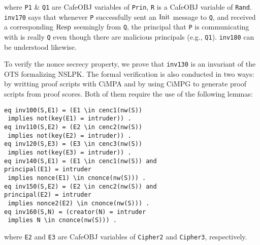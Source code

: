 \documentclass[10pt, conference, compsocconf]{IEEEtran}
\begin{document}
\noindent
where \verb!P1! \& \verb!Q1! are CafeOBJ variables of \verb!Prin!, \verb!R! is a CafeOBJ variable of \verb!Rand!.
\verb!inv170! says that whenever \verb!P! successfully sent an $\rm Init$ message to \verb!Q!, and
received a corresponding $\rm Resp$ seemingly from \verb!Q!,
the principal that \verb!P! is communicating with is really \verb!Q! even though there are malicious principals (e.g., \verb!Q1!).
\verb!inv180! can be understood likewise.

To verify the nonce secrecy property, we prove that \verb!inv130! is an invariant of the OTS formalizing NSLPK. 
The formal verification is also conducted in two ways: by writting proof scripts with CiMPA and by using CiMPG to generate proof scripts from proof scores.
Both of them require the use of the following lemmas:

\begin{small}
	\begin{verbatim}
eq inv100(S,E1) = (E1 \in cenc1(nw(S)) 
 implies not(key(E1) = intruder)) .
eq inv110(S,E2) = (E2 \in cenc2(nw(S)) 
 implies not(key(E2) = intruder)) .
eq inv120(S,E3) = (E3 \in cenc3(nw(S)) 
 implies not(key(E3) = intruder)) .
eq inv140(S,E1) = (E1 \in cenc1(nw(S)) and 
principal(E1) = intruder 
 implies nonce(E1) \in cnonce(nw(S))) .
eq inv150(S,E2) = (E2 \in cenc2(nw(S)) and 
principal(E2) = intruder
 implies nonce2(E2) \in cnonce(nw(S))) .
eq inv160(S,N) = (creator(N) = intruder 
 implies N \in cnonce(nw(S))) .
	\end{verbatim}
\end{small}

\noindent
where \verb!E2! and \verb!E3! are CafeOBJ variables of \verb!Cipher2! and \verb!Cipher3!, respectively.
\end{document}
